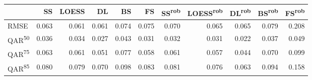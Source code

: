 \begin{tabular}{lrrrrrrrrrr}
\toprule
 & SS & LOESS & DL & BS & FS & SS\textsuperscript{rob} & LOESS\textsuperscript{rob} & DL\textsuperscript{rob} & BS\textsuperscript{rob} & FS\textsuperscript{rob} \\
\midrule
RMSE & {\cellcolor[HTML]{EEEEEE}} \color[HTML]{000000} 0.063 & {\cellcolor[HTML]{F1F1F1}} \color[HTML]{000000} 0.061 & {\cellcolor[HTML]{F1F1F1}} \color[HTML]{000000} 0.061 & {\cellcolor[HTML]{DCDCDC}} \color[HTML]{000000} 0.074 & {\cellcolor[HTML]{DADADA}} \color[HTML]{000000} 0.075 & {\cellcolor[HTML]{E2E2E2}} \color[HTML]{000000} 0.070 & {\cellcolor[HTML]{EBEBEB}} \color[HTML]{000000} 0.065 & {\cellcolor[HTML]{EBEBEB}} \color[HTML]{000000} 0.065 & {\cellcolor[HTML]{D3D3D3}} \color[HTML]{000000} 0.079 & {\cellcolor[HTML]{000000}} \color[HTML]{F1F1F1} 0.208 \\
QAR\textsuperscript{50} & {\cellcolor[HTML]{747474}} \color[HTML]{F1F1F1} 0.036 & {\cellcolor[HTML]{868686}} \color[HTML]{F1F1F1} 0.034 & {\cellcolor[HTML]{C4C4C4}} \color[HTML]{000000} 0.027 & {\cellcolor[HTML]{353535}} \color[HTML]{F1F1F1} 0.043 & {\cellcolor[HTML]{A0A0A0}} \color[HTML]{F1F1F1} 0.031 & {\cellcolor[HTML]{989898}} \color[HTML]{F1F1F1} 0.032 & {\cellcolor[HTML]{A0A0A0}} \color[HTML]{F1F1F1} 0.031 & {\cellcolor[HTML]{F1F1F1}} \color[HTML]{000000} 0.022 & {\cellcolor[HTML]{6B6B6B}} \color[HTML]{F1F1F1} 0.037 & {\cellcolor[HTML]{000000}} \color[HTML]{F1F1F1} 0.049 \\
QAR\textsuperscript{75} & {\cellcolor[HTML]{9E9E9E}} \color[HTML]{F1F1F1} 0.063 & {\cellcolor[HTML]{A6A6A6}} \color[HTML]{F1F1F1} 0.061 & {\cellcolor[HTML]{D2D2D2}} \color[HTML]{000000} 0.051 & {\cellcolor[HTML]{606060}} \color[HTML]{F1F1F1} 0.077 & {\cellcolor[HTML]{B3B3B3}} \color[HTML]{000000} 0.058 & {\cellcolor[HTML]{A6A6A6}} \color[HTML]{F1F1F1} 0.061 & {\cellcolor[HTML]{B8B8B8}} \color[HTML]{000000} 0.057 & {\cellcolor[HTML]{F1F1F1}} \color[HTML]{000000} 0.044 & {\cellcolor[HTML]{7E7E7E}} \color[HTML]{F1F1F1} 0.070 & {\cellcolor[HTML]{000000}} \color[HTML]{F1F1F1} 0.099 \\
QAR\textsuperscript{85} & {\cellcolor[HTML]{C6C6C6}} \color[HTML]{000000} 0.080 & {\cellcolor[HTML]{C8C8C8}} \color[HTML]{000000} 0.079 & {\cellcolor[HTML]{E0E0E0}} \color[HTML]{000000} 0.070 & {\cellcolor[HTML]{989898}} \color[HTML]{F1F1F1} 0.098 & {\cellcolor[HTML]{BFBFBF}} \color[HTML]{000000} 0.083 & {\cellcolor[HTML]{C3C3C3}} \color[HTML]{000000} 0.081 & {\cellcolor[HTML]{D0D0D0}} \color[HTML]{000000} 0.076 & {\cellcolor[HTML]{F1F1F1}} \color[HTML]{000000} 0.063 & {\cellcolor[HTML]{A2A2A2}} \color[HTML]{F1F1F1} 0.094 & {\cellcolor[HTML]{000000}} \color[HTML]{F1F1F1} 0.158 \\

\end{tabular}
